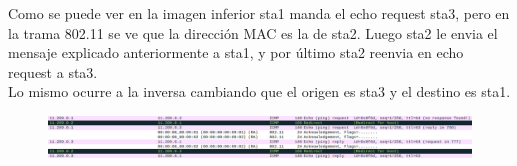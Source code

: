 \documentclass[12pt, a4paper]{report}
\begin{document}
\begin{enumerate}
	Como se puede ver en la imagen inferior sta1 manda el echo request sta3, pero en la trama 802.11 se ve que la dirección MAC es la de sta2. Luego sta2 le envia el mensaje explicado anteriormente a sta1, y por último sta2 reenvia en echo request a sta3.\\
	
	Lo mismo ocurre a la inversa cambiando que el origen es sta3 y el destino es sta1.
	\begin{figure}[H]
		\centering
		\includegraphics[width=\textwidth]{ej4.5}\\
	\end{figure}
\end{enumerate}
\end{document}
